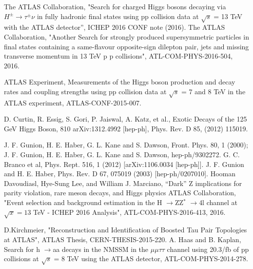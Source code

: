 \documentclass[11pt]{article}
\newcommand{\too}{$\rightarrow$}
\begin{document}
\begin{thebibliography}{99}
 {} The ATLAS Collaboration, "Search for charged Higgs bosons decaying via $H^{\pm} \rightarrow \tau^{\pm}\nu$ in fully hadronic final states using pp collision data at $\sqrt{s}$ = 13 TeV with the ATLAS detector'', ICHEP 2016 CONF note (2016).
 {} The ATLAS Collaboration, "Another Search for strongly produced supersymmetric particles in
final states containing a same-flavour opposite-sign dilepton pair, jets and missing transverse momentum in 13 TeV p p collisions", ATL-COM-PHYS-2016-504, 2016.

 ATLAS Experiment, Measurements of the Higgs boson production and decay rates and
coupling strengths using pp collision data at $\sqrt{s}$ = 7 and 8 TeV in the ATLAS experiment, ATLAS-CONF-2015-007.

 D. Curtin, R. Essig, S. Gori, P. Jaiswal, A. Katz, et al., Exotic Decays of the 125 GeV Higgs Boson,
810 arXiv:1312.4992 [hep-ph],
Phys. Rev. D 85, (2012) 115019.

 J. F. Gunion, H. E. Haber, G. L. Kane and S. Dawson, Front. Phys. 80, 1 (2000); J. F. Gunion,
H. E. Haber, G. L. Kane and S. Dawson, hep-ph/9302272.
 G. C. Branco et al, Phys. Rept. 516, 1 (2012) [arXiv:1106.0034 [hep-ph]].
 J. F. Gunion and H. E. Haber, Phys. Rev. D 67, 075019 (2003) [hep-ph/0207010].
 Hooman Davoudiasl, Hye-Sung Lee, and William J. Marciano, “Dark” Z implications for parity violation, rare meson decays, and Higgs physics
 ATLAS Collaboration, "Event selection and background estimation in the H \too ZZ$^*$ \too 4l channel at $\sqrt x=13$ TeV - ICHEP 2016 Analysis", ATL-COM-PHYS-2016-413, 2016.

 D.Kirchmeier, "Reconstruction and Identification of Boosted Tau Pair Topologies at ATLAS", ATLAS Thesis, CERN-THESIS-2015-220.
 A. Haas and B. Kaplan, Search for h \too aa decays in the NMSSM in the $\mu\mu\tau\tau$ channel using 20.3/fb of pp collisions at $\sqrt{s}$ = 8 TeV using the ATLAS detector, ATL-COM-PHYS-2014-278.  
\end{thebibliography}
\end{document}
